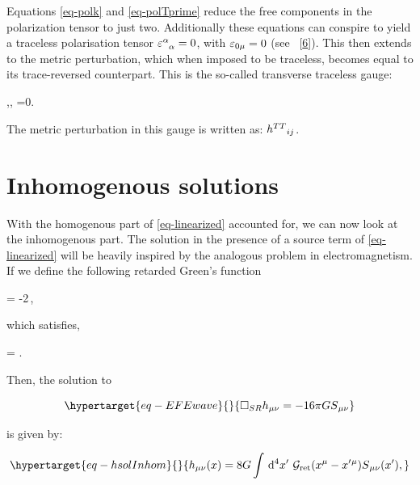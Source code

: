 \documentclass[
  10pt,
  a4paper,
  DIV=11,
  numbers=noendperiod,
  twoside]{scrreprt}
\let\[\relax \let\]\relax %
\DeclareRobustCommand{\[}{\begin{equation}}
\DeclareRobustCommand{\]}{\end{equation}}
\begin{document}
Equations \ref{eq-polk} and \ref{eq-polTprime} reduce the free
components in the polarization tensor to just two. Additionally these
equations can conspire to yield a traceless polarisation tensor
\(\trpol=0\), with \(\polco[0\mu]=0\) (see
~{[}\protect\hyperlink{ref-Carroll:2019}{6}{]}). This then extends to
the metric perturbation, which when imposed to be traceless, becomes
equal to its trace-reversed counterpart. This is the so-called
transverse traceless gauge:

\[
,\quad {}, \quad \ipdv[^]{\weakmet}{\nu}=0.
\]

The metric perturbation in this gauge is written as: \(\weakTTmet\).

\hypertarget{inhomogenous-solutions}{%
\section{Inhomogenous solutions}\label{inhomogenous-solutions}}

With the homogenous part of \ref{eq-linearized} accounted for, we can
now look at the inhomogenous part. The solution in the presence of a
source term of \ref{eq-linearized} will be heavily inspired by the
analogous problem in electromagnetism. If we define the following
retarded Green's function

\[
     = -2\pi\,,
\]

which satisfies,

\[
    \SRDA{} = .
\]

Then, the solution to

\begin{equation}\protect\hypertarget{eq-EFEwave}{}{
 \SRDA \weakmet =  -16 \pi \grav \srcco
}\label{eq-EFEwave}\end{equation}

is given by:

\begin{equation}\protect\hypertarget{eq-hsolInhom}{}{
    \weakmet(x) = 8G\int\dd[4]{x'}\,\greens{\ct{x}-\ct{x'}}\srcco(x'),
}\label{eq-hsolInhom}\end{equation}

\end{document}
